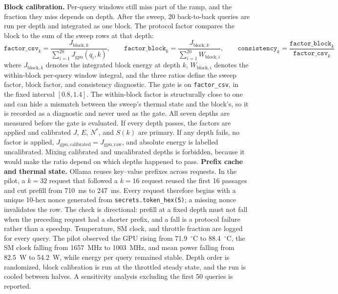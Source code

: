\documentclass[a4paper,fleqn]{cas-sc}
\begin{document}
\textbf{Block calibration.} Per-query windows still miss part of the ramp, and the fraction they miss depends on depth. After the sweep, 20 back-to-back queries are run per depth and integrated as one block. The protocol factor compares the block to the sum of the sweep rows at that depth:
\begin{equation}\label{eq:factor}
  \texttt{factor\_csv}_{k}=\frac{J_{\mathrm{block},k}}{\sum_{i=1}^{20}J_{\mathrm{gpu}}(q_{i},k)},
  \qquad
  \texttt{factor\_block}_{k}=\frac{J_{\mathrm{block},k}}{\sum_{i=1}^{20}W_{\mathrm{block},i}},
  \qquad
  \texttt{consistency}_{k}=\frac{\texttt{factor\_block}_{k}}{\texttt{factor\_csv}_{k}}
\end{equation}
where $J_{\mathrm{block},k}$ denotes the integrated block energy at depth $k$, $W_{\mathrm{block},i}$ denotes the within-block per-query window integral, and the three ratios define the sweep factor, block factor, and consistency diagnostic. The gate is on \texttt{factor\_csv}, in the fixed interval $[0.8,1.4]$. The within-block factor is structurally close to one and can hide a mismatch between the sweep's thermal state and the block's, so it is recorded as a diagnostic and never used as the gate. All seven depths are measured before the gate is evaluated. If every depth passes, the factors are applied and calibrated $J$, $E$, $N^{*}$, and $S(k)$ are primary. If any depth fails, no factor is applied, $J_{\mathrm{gpu,calibrated}}=J_{\mathrm{gpu,raw}}$, and absolute energy is labelled uncalibrated. Mixing calibrated and uncalibrated depths is forbidden, because it would make the ratio depend on which depths happened to pass. \textbf{Prefix cache and thermal state.} Ollama reuses key--value prefixes across requests. In the pilot, a $k=32$ request that followed a $k=16$ request reused the first 16 passages and cut prefill from 710~ms to 247~ms. Every request therefore begins with a unique 10-hex nonce generated from \texttt{secrets.token\_hex(5)}; a missing nonce invalidates the row. The check is directional: prefill at a fixed depth must not fall when the preceding request had a shorter prefix, and a fall is a protocol failure rather than a speedup. Temperature, SM clock, and throttle fraction are logged for every query. The pilot observed the GPU rising from 71.9~$^{\circ}$C to 88.4~$^{\circ}$C, the SM clock falling from 1657~MHz to 1003~MHz, and mean power falling from 82.5~W to 54.2~W, while energy per query remained stable. Depth order is randomized, block calibration is run at the throttled steady state, and the run is cooled between halves. A sensitivity analysis excluding the first 50 queries is reported.
\end{document}

